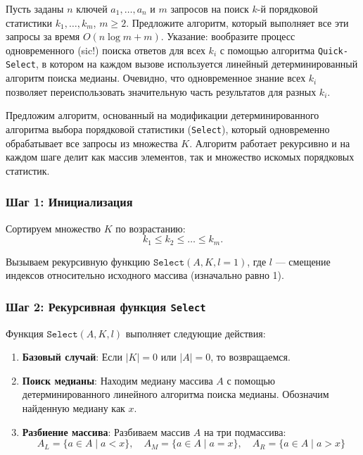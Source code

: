 \documentclass[11pt]{article}
\renewcommand{\leq}{\leqslant}  %
\renewcommand{\ge}{\geqslant}   %
\begin{document}
\begin{problem}{30}
Пусть заданы $n$ ключей $a_1, \ldots, a_n$ и $m$ запросов на поиск $k$-й порядковой статистики $k_1, \ldots, k_m$, $m \ge 2$.
Предложите алгоритм, который выполняет все эти запросы за время $O(n \log m + m)$.
Указание: вообразите процесс одновременного (sic!) поиска ответов для всех $k_i$ с помощью алгоритма \texttt{Quick-\texttt{Select}},
в котором на каждом вызове используется линейный детерминированный алгоритм поиска медианы.
Очевидно, что одновременное знание всех $k_i$ позволяет переиспользовать значительную часть результатов для разных $k_i$.
\end{problem}

\begin{solution}
    Предложим алгоритм, основанный на модификации детерминированного алгоритма выбора порядковой статистики (\texttt{Select}), который одновременно обрабатывает все запросы из множества $K$. Алгоритм работает рекурсивно и на каждом шаге делит как массив элементов, так и множество искомых порядковых статистик.

    \subsubsection*{Шаг 1: Инициализация}

    Сортируем множество $K$ по возрастанию:
    \[
        k_1 \leq k_2 \leq \dots \leq k_m.
    \]

    Вызываем рекурсивную функцию $\texttt{Select}(A, K, l = 1)$, где $l$ — смещение индексов относительно исходного массива (изначально равно 1).

    \subsubsection*{Шаг 2: Рекурсивная функция \texttt{Select}}

    Функция $\texttt{Select}(A, K, l)$ выполняет следующие действия:

    \begin{enumerate}
        \item \textbf{Базовый случай}: Если $|K| = 0$ или $|A| = 0$, то возвращаемся.

        \item \textbf{Поиск медианы}: Находим медиану массива $A$ с помощью детерминированного линейного алгоритма поиска медианы. Обозначим найденную медиану как $x$.

        \item \textbf{Разбиение массива}: Разбиваем массив $A$ на три подмассива:
              \[
                  A_L = \{ a \in A \mid a < x \}, \quad A_M = \{ a \in A \mid a = x \}, \quad A_R = \{ a \in A \mid a > x \}
              \]


\end{enumerate}
\end{solution}
\end{document}
